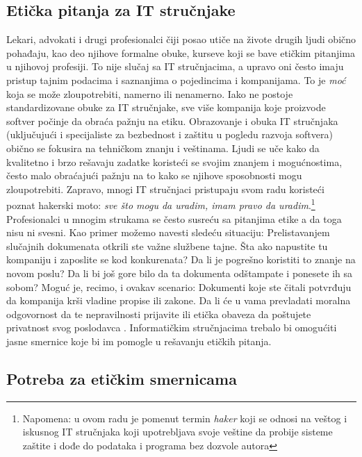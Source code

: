 \documentclass[a4paper]{article}
\begin{document}
{\subsection{Etička pitanja za IT stručnjake}

Lekari, advokati i drugi profesionalci čiji posao utiče na živote drugih ljudi obično pohađaju, kao deo njihove formalne obuke, kurseve koji se bave etičkim pitanjima u njihovoj profesiji. To nije slučaj sa IT stru\-čnja\-ci\-ma, a upravo oni često imaju pristup tajnim podacima i saznanjima o pojedincima i kompanijama. To je \emph{moć} koja se može zloupotrebiti, namerno ili nenamerno. Iako ne postoje standardizovane obuke za IT stručnjake, sve više kompanija koje proizvode softver počinje da obraća pažnju na etiku.
Obrazovanje i obuka IT stručnjaka (uključujući i specijaliste za bezbednost i zaštitu u pogledu razvoja softvera) obično se fokusira na tehničkom znanju i veštinama. Ljudi se uče kako da kvalitetno i brzo rešavaju zadatke koristeći se svojim znanjem i mogućnostima, često malo obraćajući pažnju na to kako se njihove sposobnosti mogu zloupotrebiti. Zapravo, mnogi IT stručnjaci pristupaju svom radu koristeći poznat hakerski moto: \textit{sve što mogu da uradim, imam pravo da uradim}.\footnote{Napomena: u ovom radu je pomenut termin \textit{haker} koji se odnosi na veštog i iskusnog IT stručnjaka koji upotrebljava svoje veštine da probije sisteme zaštite i dođe do podataka i programa bez dozvole autora} 
\\ Profesionalci u mnogim strukama se često susreću sa pitanjima etike a da toga nisu ni svesni. Kao primer možemo navesti sledeću situaciju: Prelistavanjem slučajnih dokumenata otkrili ste važne službene tajne. Šta ako napustite tu kompaniju i zaposlite se kod konkurenata? Da li je pogrešno koristiti to znanje na novom poslu? Da li bi još gore bilo da ta dokumenta odštampate i ponesete ih sa sobom?
Moguć je, recimo, i ovakav scenario: Dokumenti koje ste čitali potvrđuju da kompanija krši vladine propise ili zakone. Da li će u vama prevladati moralna odgovornost da te nepravilnosti prijavite ili etička obaveza da poštujete privatnost svog poslodavca \cite{Schneider}\cite{Reynolds}.
Informatičkim stručnjacima trebalo bi omogućiti jasne smernice koje bi im pomogle u rešavanju etičkih pitanja.

\subsection{Potreba za etičkim smernicama}

}
\end{document}
